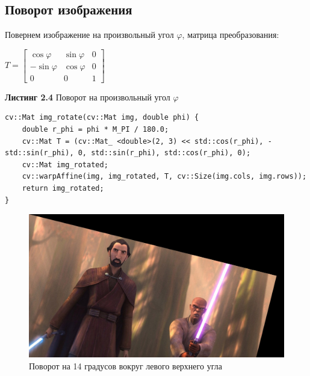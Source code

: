     \subsection{Поворот изображения}
    Повернем изображение на произвольный угол $\varphi$, матрица преобразования:
    \begin{center}
        $
        T = 
        \begin{bmatrix}
            \cos \varphi & \sin \varphi & 0\\
            -\sin \varphi & \cos \varphi & 0\\
            0 & 0 & 1
        \end{bmatrix}
        $  
    \end{center}
    \noindent \textbf{Листинг 2.4} Поворот на произвольный угол $\varphi$
    \begin{lstlisting}
cv::Mat img_rotate(cv::Mat img, double phi) {
    double r_phi = phi * M_PI / 180.0;
    cv::Mat T = (cv::Mat_ <double>(2, 3) << std::cos(r_phi), -std::sin(r_phi), 0, std::sin(r_phi), std::cos(r_phi), 0);
    cv::Mat img_rotated;
    cv::warpAffine(img, img_rotated, T, cv::Size(img.cols, img.rows));
    return img_rotated;
}
    \end{lstlisting}
    \begin{figure}[h]
        \centering
        \includegraphics[scale=0.26]{"../images/results/img_rotation.jpg"}
        \caption{Поворот на 14 градусов вокруг левого верхнего угла}
    \end{figure}
    \newpage
